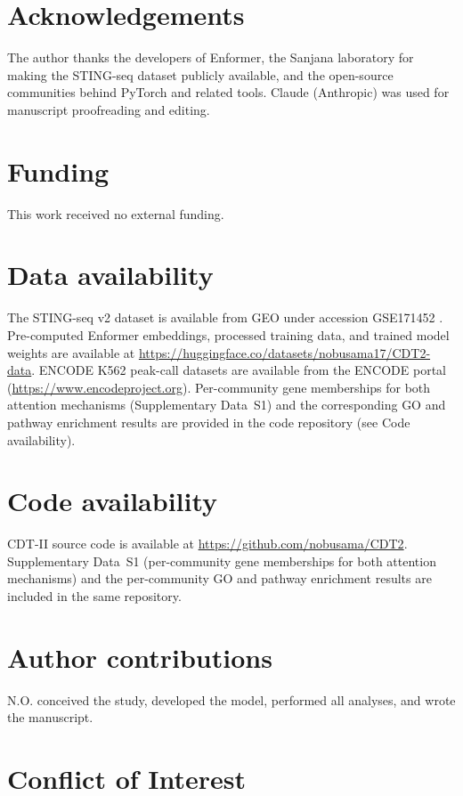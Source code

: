 \documentclass[12pt,a4paper]{article}
\begin{document}
\section*{Acknowledgements}

The author thanks the developers of Enformer, the Sanjana laboratory for making the STING-seq dataset publicly available, and the open-source communities behind PyTorch and related tools. Claude (Anthropic) was used for manuscript proofreading and editing.

\section*{Funding}

This work received no external funding.

\section*{Data availability}

The STING-seq v2 dataset is available from GEO under accession GSE171452 \citep{morris2023}. Pre-computed Enformer embeddings, processed training data, and trained model weights are available at \url{https://huggingface.co/datasets/nobusama17/CDT2-data}. ENCODE K562 peak-call datasets are available from the ENCODE portal (\url{https://www.encodeproject.org}). Per-community gene memberships for both attention mechanisms (Supplementary Data~S1) and the corresponding GO and pathway enrichment results are provided in the code repository (see Code availability).

\section*{Code availability}

CDT-II source code is available at \url{https://github.com/nobusama/CDT2}. Supplementary Data~S1 (per-community gene memberships for both attention mechanisms) and the per-community GO and pathway enrichment results are included in the same repository.

\section*{Author contributions}

N.O. conceived the study, developed the model, performed all analyses, and wrote the manuscript.

\section*{Conflict of Interest}
\end{document}
